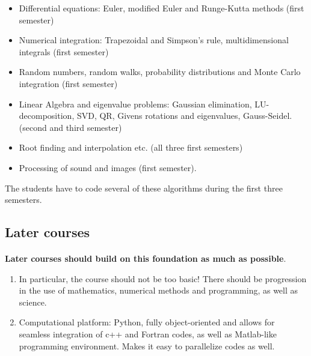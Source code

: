 \documentclass[%
twoside,                 %
final,                   %
10pt]{article}
\begin{document}
\begin{itemize}
\item Differential equations: Euler, modified Euler and Runge-Kutta methods (first semester)

\item Numerical integration: Trapezoidal and Simpson's rule, multidimensional integrals (first semester)

\item Random numbers, random walks, probability distributions and Monte Carlo integration  (first semester)

\item Linear Algebra and eigenvalue problems: Gaussian elimination, LU-decomposition, SVD, QR, Givens rotations and eigenvalues, Gauss-Seidel. (second and third semester)

\item Root finding and interpolation etc. (all three first semesters)

\item Processing of sound and images (first semester).
\end{itemize}

\noindent
The students have to code several of these algorithms during the first three semesters.




\subsection{Later courses}

\paragraph{}

\textbf{Later courses should build on this foundation as much as possible}.

\begin{enumerate}
\item In particular, the course should not be too basic! There should be progression in the use of mathematics, numerical methods and programming, as well as science.

\item Computational platform: Python, fully object-oriented and allows for seamless integration of c++ and Fortran codes, as well as Matlab-like programming environment. Makes it easy to parallelize codes as well.
\end{enumerate}
\end{document}
